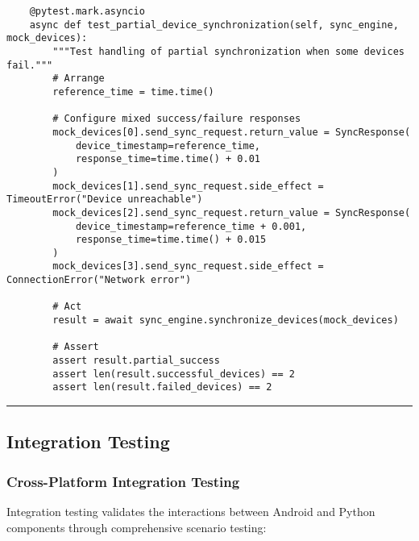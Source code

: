 \documentclass[12pt,a4paper]{report}
\begin{document}
\begin{verbatim}
    @pytest.mark.asyncio
    async def test_partial_device_synchronization(self, sync_engine, mock_devices):
        """Test handling of partial synchronization when some devices fail."""
        # Arrange
        reference_time = time.time()

        # Configure mixed success/failure responses
        mock_devices[0].send_sync_request.return_value = SyncResponse(
            device_timestamp=reference_time,
            response_time=time.time() + 0.01
        )
        mock_devices[1].send_sync_request.side_effect = TimeoutError("Device unreachable")
        mock_devices[2].send_sync_request.return_value = SyncResponse(
            device_timestamp=reference_time + 0.001,
            response_time=time.time() + 0.015
        )
        mock_devices[3].send_sync_request.side_effect = ConnectionError("Network error")

        # Act
        result = await sync_engine.synchronize_devices(mock_devices)

        # Assert
        assert result.partial_success
        assert len(result.successful_devices) == 2
        assert len(result.failed_devices) == 2
\end{verbatim}

\hrule

\subsection{Integration Testing}

\subsubsection{Cross-Platform Integration Testing}

Integration testing validates the interactions between Android and Python components through comprehensive scenario
testing:
\end{document}
